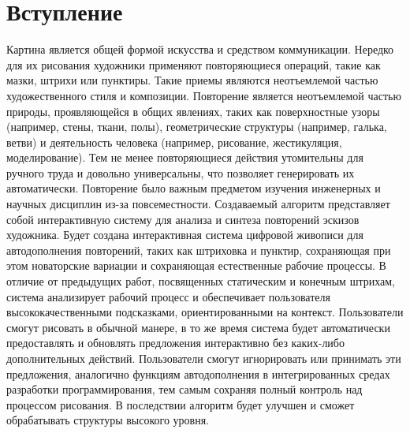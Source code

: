 \chapter{Вступление}
\label{cha:intro}
Картина является общей формой искусства и средством коммуникации. Нередко для их рисования художники применяют повторяющиеся операций, такие как мазки, штрихи или пунктиры. Такие приемы являются неотъемлемой частью художественного стиля и композиции. Повторение является неотъемлемой частью природы, проявляющейся в общих явлениях, таких как поверхностные узоры (например, стены, ткани, полы), геометрические структуры (например, галька, ветви) и деятельность человека (например, рисование, жестикуляция, моделирование). Тем не менее повторяющиеся действия утомительны для ручного труда и довольно универсальны, что позволяет генерировать их автоматически. 
Повторение было важным предметом изучения инженерных и научных дисциплин из-за повсеместности. Создаваемый алгоритм представляет собой интерактивную систему для анализа и синтеза повторений эскизов художника. Будет создана интерактивная система цифровой живописи для автодополнения повторений, таких как штриховка и пунктир, сохраняющая при этом новаторские вариации и сохраняющая естественные рабочие процессы. В отличие от предыдущих работ, посвященных статическим и конечным штрихам, система анализирует рабочий процесс и обеспечивает пользователя высококачественными подсказками, ориентированными на контекст. Пользователи смогут рисовать в обычной манере, в то же время система будет автоматически предоставлять и обновлять предложения интерактивно без каких-либо дополнительных действий. Пользователи смогут игнорировать или принимать эти предложения, аналогично функциям автодополнения в интегрированных средах разработки программирования, тем самым сохраняя полный контроль над процессом рисования. В последствии алгоритм будет улучшен и сможет обрабатывать структуры высокого уровня.